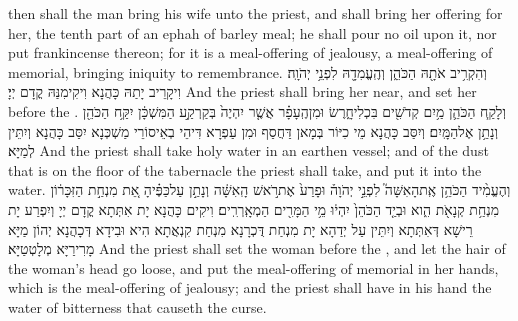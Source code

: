 {then shall the man bring his wife unto the priest, and shall bring her offering for her, the tenth part of an ephah of barley meal; he shall pour no oil upon it, nor put frankincense thereon; for it is a meal-offering of jealousy, a meal-offering of memorial, bringing iniquity to remembrance.}{}
{וְהִקְרִ֥יב אֹתָ֖הּ הַכֹּהֵ֑ן וְהֶֽעֱמִדָ֖הּ לִפְנֵ֥י יְהֹוָֽה׃}
{וִיקָרֵיב יָתַהּ כָּהֲנָא וִיקִימִנַּהּ קֳדָם יְיָ׃}
{And the priest shall bring her near, and set her before the \lord.}{}
{וְלָקַ֧ח הַכֹּהֵ֛ן מַ֥יִם קְדֹשִׁ֖ים בִּכְלִי\maqqaf חָ֑רֶשׂ וּמִן\maqqaf הֶֽעָפָ֗ר אֲשֶׁ֤ר יִהְיֶה֙ בְּקַרְקַ֣ע הַמִּשְׁכָּ֔ן יִקַּ֥ח הַכֹּהֵ֖ן וְנָתַ֥ן אֶל\maqqaf הַמָּֽיִם׃}
{וְיִסַּב כָּהֲנָא מֵי כִיּוֹר בְּמָאן דַּחֲסַף וּמִן עַפְרָא דִּיהֵי בְאֵיסוֹרֵי מַשְׁכְּנָא יִסַּב כָּהֲנָא וְיִתֵּין לְמַיָּא׃}
{And the priest shall take holy water in an earthen vessel; and of the dust that is on the floor of the tabernacle the priest shall take, and put it into the water.}{}
{וְהֶעֱמִ֨יד הַכֹּהֵ֥ן אֶֽת\maqqaf הָאִשָּׁה֮ לִפְנֵ֣י יְהֹוָה֒ וּפָרַע֙ אֶת\maqqaf רֹ֣אשׁ הָֽאִשָּׁ֔ה וְנָתַ֣ן עַל\maqqaf כַּפֶּ֗יהָ אֵ֚ת מִנְחַ֣ת הַזִּכָּר֔וֹן מִנְחַ֥ת קְנָאֹ֖ת הִ֑וא וּבְיַ֤ד הַכֹּהֵן֙ יִהְי֔וּ מֵ֥י הַמָּרִ֖ים הַמְאָֽרְרִֽים׃}
{וִיקִים כָּהֲנָא יָת אִתְּתָא קֳדָם יְיָ וְיִפְרַע יָת רֵישָׁא דְּאִתְּתָא וְיִתֵּין עַל יְדַהָא יָת מִנְחַת דֻּכְרָנָא מִנְחַת קִנְאֲתָא הִיא וּבִידָא דְּכָהֲנָא יְהוֹן מַיָּא מָרִירַיָּא מְלָטְטַיָּא׃}
{And the priest shall set the woman before the \lord, and let the hair of the woman’s head go loose, and put the meal-offering of memorial in her hands, which is the meal-offering of jealousy; and the priest shall have in his hand the water of bitterness that causeth the curse.}{}
